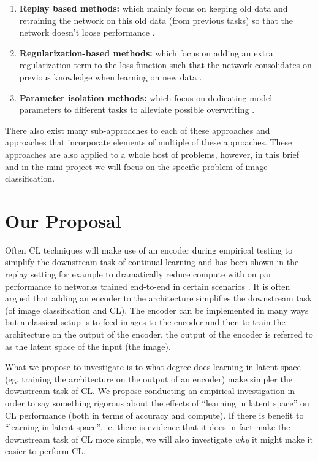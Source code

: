 \begin{enumerate}
    \item \textbf{Replay based methods:} which mainly focus on keeping old data and retraining the network on this old data (from previous tasks) so that the network doesn't loose performance \cite{rolnick2019replay,shin2017replay}.
    \item \textbf{Regularization-based methods:} which focus on adding an extra regularization term to the loss function such that the network consolidates on previous knowledge when learning on new data \cite{kirkpatrick2017reg,zenke2017reg}.
    \item \textbf{Parameter isolation methods:} which focus on dedicating model parameters to different tasks to alleviate possible overwriting \cite{mallya2018paramiso, serra2018paramiso} . 
\end{enumerate} 
There also exist many sub-approaches to each of these approaches and approaches that incorporate elements of multiple of these approaches. These approaches are also applied to a whole host of problems, however, in this brief and in the mini-project we will focus on the specific problem of image classification. 


\section{Our Proposal}
Often CL techniques will make use of an encoder \cite{bank2020autoencoders} during empirical testing to simplify the downstream task of continual learning and has been shown in the replay setting for example to dramatically reduce compute with on par performance to networks trained end-to-end in certain scenarios \cite{ostapenko2022continual}. It is often argued that adding an encoder to the architecture simplifies the downstream task (of image classification and CL). The encoder can be implemented in many ways but a classical setup is to feed images to the encoder and then to train the architecture on the output of the encoder, the output of the encoder is referred to as the latent space of the input (the image). 


What we propose to investigate is to what degree does learning in latent space (eg. training the architecture on the output of an encoder) make simpler the downstream task of CL. We propose conducting an empirical investigation in order to say something rigorous about the effects of ``learning in latent space'' on CL performance (both in terms of accuracy and compute). If there is benefit to ``learning in latent space'', ie. there is evidence that it does in fact make the downstream task of CL more simple, we will also investigate \textit{why} it might make it easier to perform CL.

